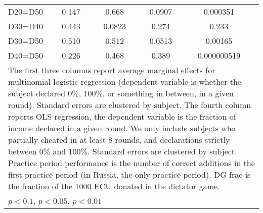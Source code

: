 \begin{tabular}{l|cccccc|cc}
D20=D50         &    0.147         &         &    0.668         &         &   0.0907         &         & 0.000351         &         \\
D30=D40         &    0.443         &         &   0.0823         &         &    0.274         &         &    0.233         &         \\
D30=D50         &    0.510         &         &    0.512         &         &   0.0513         &         &  0.00165         &         \\
D40=D50         &    0.226         &         &    0.468         &         &    0.389         &         &0.000000519         &         \\
\hline\hline
\multicolumn{9}{p{16cm}}{\tiny The first three columns report average marginal effects for multinomial logistic regression (dependent variable is whether the subject declared 0\%, 100\%, or something in between, in a given round). Standard errors are clustered by subject. The fourth column reports OLS regression, the dependent variable is the fraction of income declared in a given round. We only include subjects who partially cheated in at least 8 rounds, and declarations strictly between 0\% and 100\%. Standard errors are clustered by subject. Practice period performance is the number of correct additions in the first practice period (in Russia, the only practice period). DG frac is the fraction of the 1000 ECU donated in the dictator game.}\\
\multicolumn{9}{l}{\tiny \sym{*} \(p<0.1\), \sym{**} \(p<0.05\), \sym{***} \(p<0.01\)}\\
\end{tabular}